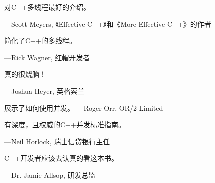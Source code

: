 
对C++多线程最好的介绍。

\hfill—Scott Meyers, 《Effective C++》和《More Effective C++》的作者

简化了C++的多线程。

\hfill —Rick Wagner, 红帽开发者

真的很烧脑！

\hfill —Joshua Heyer, 英格索兰

展示了如何使用并发。
\hfill —Roger Orr, OR/2 Limited

有深度，且权威的C++并发标准指南。

\hfill —Neil Horlock, 瑞士信贷银行主任

C++开发者应该去认真的看这本书。

\hfill —Dr. Jamie Allsop, 研发总监

